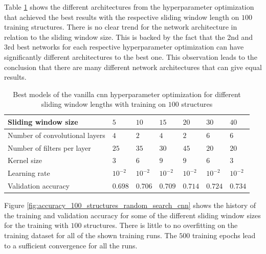 \documentclass[conference]{IEEEtran}
\begin{document}
Table \ref{tab:hyperparameters_100_structures} shows the different architectures from the hyperparameter optimization that achieved the best results with the respective sliding window length on $ 100 $ training structures. There is no clear trend for the network architecture in relation to the sliding window size. This is backed by the fact that the 2nd and 3rd best networks for each respective hyperparameter optimization can have significantly different architectures to the best one. This observation leads to the conclusion that there are many different network architectures that can give equal results.

\begin{table}[htp]
	\centering
	\caption{Best models of the vanilla \gls{cnn} hyperparameter optimization for different sliding window lengths with training on $ 100 $ structures}
	\label{tab:hyperparameters_100_structures}
	\setlength{\tabcolsep}{3pt} %
	\begin{tabular}{p{2.5cm}|llllll}
		Sliding window size & $ 5 $ & $ 10 $ & $ 15 $ & $ 20 $ & $ 30 $ & $ 40 $ \\
		\hline
		Number of convolutional layers & $ 4 $ & $ 2 $ & $ 4 $ & $ 2 $ & $ 6 $ & $ 6 $ \\
		Number of filters per layer & $ 25 $ & $ 35 $ & $ 30 $ & $ 45 $ & $ 20 $ & $ 20 $ \\
		Kernel size & $ 3 $ & $ 6 $ & $ 9 $ & $ 9 $ & $ 6 $ & $ 3 $ \\
		Learning rate & $ 10^{-2} $ & $ 10^{-2} $ & $ 10^{-2} $ & $ 10^{-2} $ & $ 10^{-2} $ & $ 10^{-2} $ \\
		\hline
		Validation accuracy & $ 0.698 $ & $ 0.706 $ & $ 0.709 $ & $ 0.714 $ & $ 0.724 $ & $ 0.734 $
	\end{tabular}
\end{table}

Figure \ref{fig:accuracy_100_structures_random_search_cnn} shows the history of the training and validation accuracy for some of the different sliding window sizes for the training with $ 100 $ structures. There is little to no overfitting on the training dataset for all of the shown training runs. The $ 500 $ training epochs lead to a sufficient convergence for all the runs.
\end{document}
